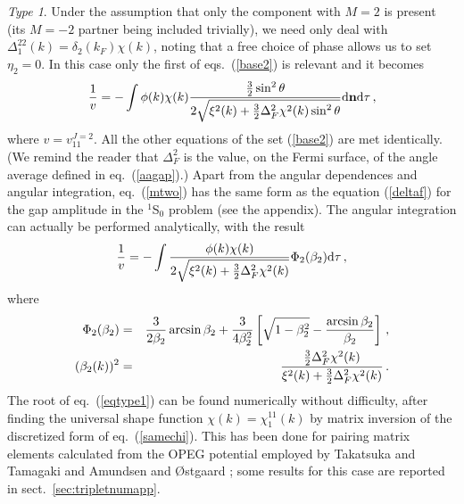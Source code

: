 {\it Type 1}.  
Under the assumption that only the component with $M=2$
is present (its $M=-2$ partner being included trivially), 
we need only deal with $\Delta_1^{22}(k)=\delta_2(k_F)\chi(k)$,
noting that a free choice of phase allows us to set $\eta_2=0$.
In this case only the first of eqs.~(\ref{base2}) is relevant and
it becomes
\begin{equation}
{1\over v} =- \int  \phi(k)\chi(k) {{3\over 2}\sin^2\theta\over
2\sqrt{\xi^2(k) +{3\over 2}\Delta_F^2\chi^2(k)\sin^2\theta}}
 {\rm d} {\bf n} {\rm d} \tau \, ,
\label{mtwo}
\end{equation}
where $v=v_{11}^{J=2}$.  All the other equations of the set 
(\ref{base2}) are met identically.  (We remind the reader that 
$\Delta_F^2$ is the value, on the Fermi surface, of the angle 
average defined in eq.~(\ref{aagap}).)  Apart from the angular
dependences and angular integration, eq.~(\ref{mtwo}) has the same form
as the equation (\ref{deltaf}) for the gap amplitude in the $^1$S$_0$
problem (see the appendix).  The angular integration can actually 
be performed analytically, with the result
\begin{equation}
{1\over v} =-  \int   {\phi(k)\chi(k) \over 2\sqrt{\xi^2(k) +
      \frac32\Delta^2_F\chi^2(k)}}\Phi_2(\beta_2){\rm d}\tau \, ,
\label{eqtype1}
\end{equation}
where
\begin{eqnarray}
\Phi_2(\beta_2) &=& \frac{3}{2\beta_2} \arcsin \beta_2 + \frac{3}{4\beta_2^2}
\left[\sqrt{1 - \beta_2^2}-  {\arcsin \beta_2\over\beta_2}\right] \, ,
\nonumber \\
(\beta_2(k))^2 &=& {{3\over 2}\Delta^2_F\chi^2(k)\over \xi^2(k) +
{3\over 2}\Delta_F^2\chi^2(k)}
\, .
\end{eqnarray}
The root of eq.~(\ref{eqtype1}) can be found numerically without difficulty,
after finding the universal shape function $\chi(k)=\chi_1^{11}(k)$
by matrix inversion of the discretized form of eq.~(\ref{samechi}).
This has been done for pairing matrix elements calculated from the 
OPEG potential employed by Takatsuka and Tamagaki \cite{tt71,ttr} and
Amundsen and {\O}stgaard \cite{ostgaard}; some results for this
case are reported in sect.~\ref{sec:tripletnumapp}.  

